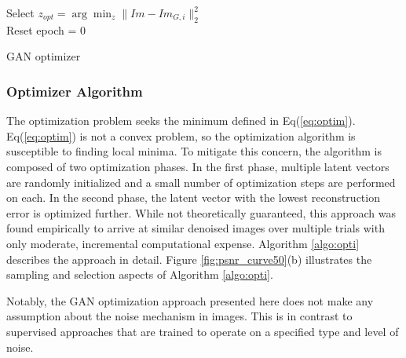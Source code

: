 \documentclass{article}
\begin{document}
\begin{minipage}[t]{.46\linewidth}
\begin{algorithm}[H]
\SetAlgoLined
{}
\vspace{1ex}
 Select $z_{opt} = \arg\min_z  \|Im - Im_{G,i}\|^2_2$ \\
 Reset epoch = 0 \\
\vspace{1ex}
 \caption{GAN optimizer}
 \label{algo:opti}
\end{algorithm}
\end{minipage}

\subsubsection{Optimizer Algorithm}
The optimization problem seeks the minimum defined in Eq(\ref{eq:optim}). Eq(\ref{eq:optim}) is not a convex problem, so the optimization algorithm is susceptible to finding local minima. To mitigate this concern, the algorithm is composed of two optimization phases. In the first phase, multiple latent vectors are randomly initialized and a small number of optimization steps are performed on each. In the second phase, the latent vector with the lowest reconstruction error is optimized further. While not theoretically guaranteed, this approach was found empirically to arrive at similar denoised images over multiple trials with only moderate, incremental computational expense. Algorithm \ref{algo:opti} describes the approach in detail. Figure \ref{fig:psnr_curve50}(b) illustrates the sampling and selection aspects of Algorithm \ref{algo:opti}. 

Notably, the GAN optimization approach presented here does not make any assumption about the noise mechanism in images. This is in contrast to supervised approaches that are trained to operate on a specified type and level of noise.
\end{document}
